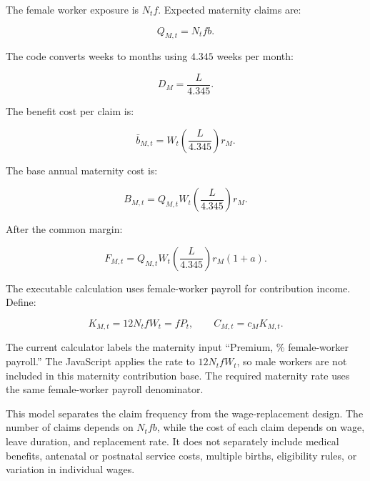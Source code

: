 The female worker exposure is $N_tf$. Expected maternity claims are:

\begin{equation}
Q_{M,t}=N_tfb.
\end{equation}

The code converts weeks to months using $4.345$ weeks per month:

\begin{equation}
D_M=\frac{L}{4.345}.
\end{equation}

The benefit cost per claim is:

\begin{equation}
\bar{b}_{M,t}=W_t\left(\frac{L}{4.345}\right)r_M.
\end{equation}

The base annual maternity cost is:

\begin{equation}
B_{M,t}=Q_{M,t}W_t\left(\frac{L}{4.345}\right)r_M.
\end{equation}

After the common margin:

\begin{equation}
F_{M,t}=Q_{M,t}W_t\left(\frac{L}{4.345}\right)r_M(1+a).
\end{equation}

The executable calculation uses female-worker payroll for contribution income. Define:

\begin{equation}
K_{M,t}=12N_tfW_t=fP_t,
\qquad
C_{M,t}=c_MK_{M,t}.
\end{equation}

\begin{importantnote}
The current calculator labels the maternity input ``Premium, \% female-worker payroll.'' The JavaScript applies the rate to $12N_tfW_t$, so male workers are not included in this maternity contribution base. The required maternity rate uses the same female-worker payroll denominator.
\end{importantnote}

\begin{interpretation}
This model separates the claim frequency from the wage-replacement design. The number of claims depends on $N_tfb$, while the cost of each claim depends on wage, leave duration, and replacement rate. It does not separately include medical benefits, antenatal or postnatal service costs, multiple births, eligibility rules, or variation in individual wages.
\end{interpretation}

